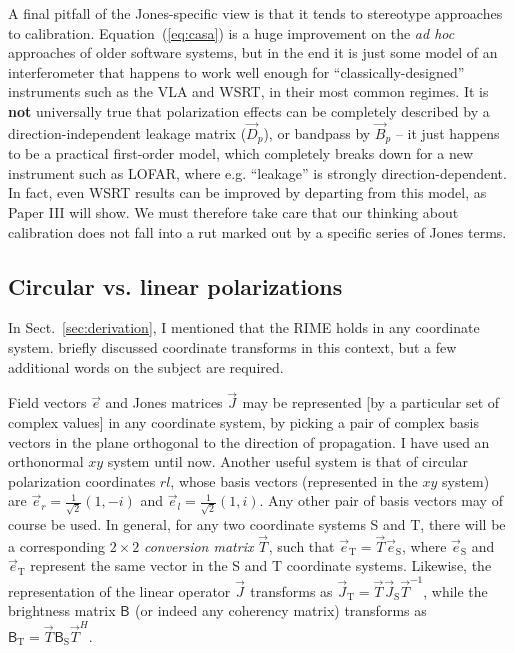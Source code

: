 \documentclass{aa}
\newcommand{\herm}{H}
\newcommand{\jones}[2]{\vec {#1}_{#2}}
\newcommand{\jonesinv}[2]{\vec {#1}^{-1}_{#2}}
\newcommand{\jonesT}[2]{\vec {#1}^{\herm}_{#2}}
\newcommand{\coh}[2]{\mathsf{{#1}}_{{#2}}}
\begin{document}
A final pitfall of the Jones-specific view is that it tends to stereotype approaches to calibration. Equation~(\ref{eq:casa}) is a huge improvement on the \emph{ad hoc} approaches of older software systems, but in the end it is just some model of an interferometer that happens to work well enough for ``classically-designed'' instruments such as the VLA and WSRT, in their most common regimes. It is {\bf not} universally true that polarization effects can be completely described by a direction-independent leakage matrix ($\jones{D}{p}$), or bandpass by $\jones{B}{p}$ -- it just happens to be a practical first-order model, which completely breaks down for a new instrument such as LOFAR, where e.g. ``leakage'' is strongly direction-dependent. In fact, even WSRT results can be improved by departing from this model, as Paper III \citep{RRIME3} will show. We must therefore take care that our thinking about calibration does not fall into a rut marked out by a specific series of Jones terms.

\subsection{\label{sec:circular}Circular vs. linear polarizations}

In Sect.~\ref{sec:derivation}, I mentioned that the RIME holds in any coordinate system. \citet{ME1} briefly 
discussed coordinate transforms in this context, but a few additional words on the subject are required.

Field vectors $\vec e$ and Jones matrices $\jones{J}{}$ may be represented [by a particular set of complex values] in any coordinate system, by picking a pair of complex basis vectors in the plane orthogonal to the direction of propagation. I have used an orthonormal $xy$ system until now. Another useful system is that of circular polarization coordinates $rl$, whose basis vectors (represented in the $xy$ system) are $\vec e_r=\frac{1}{\sqrt{2}}(1,-i)$ and $\vec e_l=\frac{1}{\sqrt{2}}(1,i)$. Any other pair of basis vectors may of course be used. In general, for any two coordinate systems S and T, there will be a corresponding $2\times2$ {\em conversion matrix} $\jones{T}{}$, such that $\vec e_\mathrm{T}=\jones{T}{} \vec e_\mathrm{S}$, where $\vec e_\mathrm{S}$ and $\vec e_\mathrm{T}$ represent the same vector in the S and T coordinate systems. Likewise, the representation of the linear operator $\jones{J}{}$ transforms as $\jones{J}{\mathrm{T}}=\jones{T}{} \jones{J}{\mathrm{S}} \jonesinv{T}{}$, while the brightness matrix $\coh{B}{}$ (or indeed any coherency matrix) transforms as $\coh{B}{\mathrm{T}}=\jones{T}{} \coh{B}{\mathrm{S}} \jonesT{T}{}.$
\end{document}
